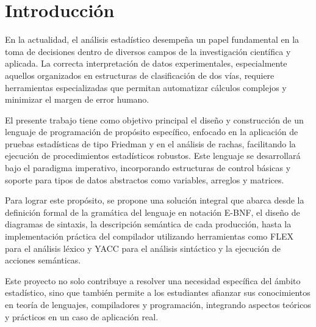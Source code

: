 \documentclass{article}
\begin{document}
\tableofcontents %

\newpage %



\section{Introducción}\label{sec:intr}

En la actualidad, el análisis estadístico desempeña un papel fundamental en la toma de decisiones dentro de diversos campos de la investigación científica y aplicada. La correcta interpretación de datos experimentales, especialmente aquellos organizados en estructuras de clasificación de dos vías, requiere herramientas especializadas que permitan automatizar cálculos complejos y minimizar el margen de error humano.

El presente trabajo tiene como objetivo principal el diseño y construcción de un lenguaje de programación de propósito específico, enfocado en la aplicación de pruebas estadísticas de tipo Friedman y en el análisis de rachas, facilitando la ejecución de procedimientos estadísticos robustos. Este lenguaje se desarrollará bajo el paradigma imperativo, incorporando estructuras de control básicas y soporte para tipos de datos abstractos como variables, arreglos y matrices.

Para lograr este propósito, se propone una solución integral que abarca desde la definición formal de la gramática del lenguaje en notación E-BNF, el diseño de diagramas de sintaxis, la descripción semántica de cada producción, hasta la implementación práctica del compilador utilizando herramientas como FLEX para el análisis léxico y YACC para el análisis sintáctico y la ejecución de acciones semánticas.

Este proyecto no solo contribuye a resolver una necesidad específica del ámbito estadístico, sino que también permite a los estudiantes afianzar sus conocimientos en teoría de lenguajes, compiladores y programación, integrando aspectos teóricos y prácticos en un caso de aplicación real.
\end{document}
